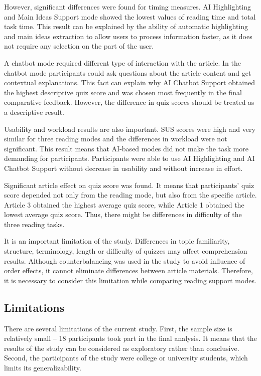 \documentclass{IEEEtran}
\begin{document}
However, significant differences were found for timing measures. AI Highlighting and Main Ideas Support mode showed the lowest values of reading time and total task time. This result can be explained by the ability of automatic highlighting and main ideas extraction to allow users to process information faster, as it does not require any selection on the part of the user.

A chatbot mode required different type of interaction with the article. In the chatbot mode participants could ask questions about the article content and get contextual explanations. This fact can explain why AI Chatbot Support obtained the highest descriptive quiz score and was chosen most frequently in the final comparative feedback. However, the difference in quiz scores should be treated as a descriptive result.

Usability and workload results are also important. SUS scores were high and very similar for three reading modes and the differences in workload were not significant. This result means that AI-based modes did not make the task more demanding for participants. Participants were able to use AI Highlighting and AI Chatbot Support without decrease in usability and without increase in effort.

Significant article effect on quiz score was found. It means that participants' quiz score depended not only from the reading mode, but also from the specific article. Article 3 obtained the highest average quiz score, while Article 1 obtained the lowest average quiz score. Thus, there might be differences in difficulty of the three reading tasks.

It is an important limitation of the study. Differences in topic familiarity, structure, terminology, length or difficulty of quizzes may affect comprehension results. Although counterbalancing was used in the study to avoid influence of order effects, it cannot eliminate differences between article materials. Therefore, it is necessary to consider this limitation while comparing reading support modes.

\subsection{Limitations}

There are several limitations of the current study. First, the sample size is relatively small – 18 participants took part in the final analysis. It means that the results of the study can be considered as exploratory rather than conclusive. Second, the participants of the study were college or university students, which limits its generalizability.
\end{document}
